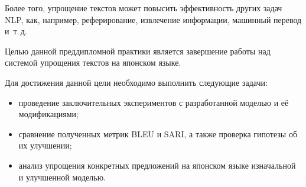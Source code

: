 Более того, упрощение текстов может повысить эффективность других задач NLP, как, например, реферирование, извлечение информации, машинный перевод и~т.\,д.

Целью данной преддипломной практики является завершение работы над системой упрощения текстов на японском языке.

Для достижения данной цели необходимо выполнить следующие задачи:
\begin{itemize}%
  \item проведение заключительных экспериментов с разработанной моделью и её модификациями;
  \item сравнение полученных метрик BLEU и SARI, а также проверка гипотезы об их улучшении;
  \item анализ упрощения конкретных предложений на японском языке изначальной и улучшенной моделью.
\end{itemize}


